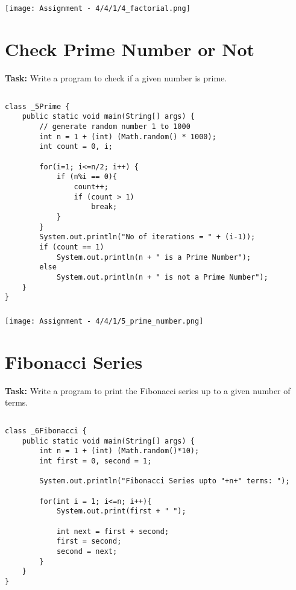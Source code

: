 \documentclass[12pt,a4paper]{article}
\begin{document}
\subsubsection{}
\begin{center}
    \texttt{[image: Assignment - 4/4/1/4\_factorial.png]}
\end{center}

\section{Check Prime Number or Not}
\textbf{Task:} Write a program to check if a given number is prime.

\subsection{}
\begin{lstlisting}
class _5Prime {
    public static void main(String[] args) {
        // generate random number 1 to 1000
        int n = 1 + (int) (Math.random() * 1000);
        int count = 0, i;
    
        for(i=1; i<=n/2; i++) {
            if (n%i == 0){
                count++;
                if (count > 1)
                    break;
            }
        }
        System.out.println("No of iterations = " + (i-1));
        if (count == 1)
            System.out.println(n + " is a Prime Number");
        else
            System.out.println(n + " is not a Prime Number");
    }
}
\end{lstlisting}

\subsubsection{}
\begin{center}
    \texttt{[image: Assignment - 4/4/1/5\_prime\_number.png]}
\end{center}

\section{Fibonacci Series}
\textbf{Task:} Write a program to print the Fibonacci series up to a given number of terms.

\subsection{}
\begin{lstlisting}
class _6Fibonacci {
    public static void main(String[] args) {
        int n = 1 + (int) (Math.random()*10);
        int first = 0, second = 1;
    
        System.out.println("Fibonacci Series upto "+n+" terms: ");
    
        for(int i = 1; i<=n; i++){
            System.out.print(first + " ");
    
            int next = first + second;
            first = second;
            second = next;
        }
    }
}
\end{lstlisting}
\end{document}
